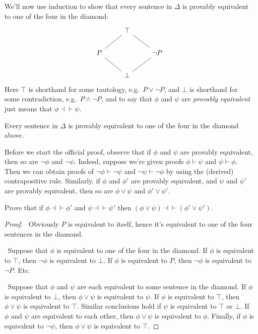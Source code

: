 We'll now use induction to show that every sentence in $\Delta$ is
provably equivalent to one of the four in the diamond:
\[ \begin{tikzcd} & \arrow[-]{dl} \top \arrow[-]{dr} & \\
    P & & \neg P \\
    & \arrow[-]{ul} \bot \arrow[-]{ur} & \end{tikzcd} \] Here $\top$
is shorthand for some tautology, e.g.\ $P\vee\neg P$, and $\bot$ is
shorthand for some contradiction, e.g.\ $P\wedge\neg P$, and to say
that $\phi$ and $\psi$ are \emph{provably equivalent} just means that
$\phi\dashv\vdash\psi$.

\begin{prop} Every sentence in $\Delta$ is provably equivalent to one of
   the four in the diamond above.
\end{prop}

 Before we start the official proof, observe that if $\phi$ and $\psi$
 are provably equivalent, then so are $\neg\phi$ and $\neg\psi$.
 Indeed, suppose we're given proofs $\phi\vdash\psi$ and
 $\psi\vdash\phi$.  Then we can obtain proofs of
 $\neg\phi\vdash\neg\psi$ and $\neg\psi\vdash\neg\phi$ by using the
 (derived) contrapositive rule.  Similarly, if $\phi$ and $\phi '$ are
 provably equivalent, and $\psi$ and $\psi '$ are provably equivalent,
 then so are $\phi\vee\psi$ and $\phi '\vee\psi
 '$.

 \begin{exercise} Prove that if $\phi\dashv\vdash\phi '$ and
   $\psi\dashv\vdash\psi '$ then
   $(\phi\vee\psi )\dashv\vdash (\phi '\vee\psi ')$. \end{exercise}
 
 \begin{proof}   \, Obviously $P$ is equivalent to itself, hence it's
   equivalent to one of the four sentences in the diamond.

   \bigskip \noindent {} \, Suppose that $\phi$ is equivalent to one of
   the four in the diamond.  If $\phi$ is equivalent to $\top$, then
   $\neg\phi$ is equivalent to $\bot$.  If $\phi$ is equivalent to
   $P$, then $\neg\phi$ is equivalent to $\neg P$.  Etc.

   \bigskip \noindent {} \, Suppose that $\phi$
   and $\psi$ are each equivalent to some sentence in the diamond.  If
   $\phi$ is equivalent to $\bot$, then $\phi\vee\psi$ is equivalent
   to $\psi$.  If $\phi$ is equivalent to $\top$, then $\phi\vee\psi$
   is equivalent to $\top$.  Similar conclusions hold if $\psi$ is
   equivalent to $\top$ or $\bot$.  If $\phi$ and $\psi$ are
   equivalent to each other, then $\phi\vee\psi$ is equivalent to
   $\phi$.  Finally, if $\phi$ is equivalent to $\neg\psi$, then
   $\phi\vee\psi$ is equivalent to $\top$.
 \end{proof}

